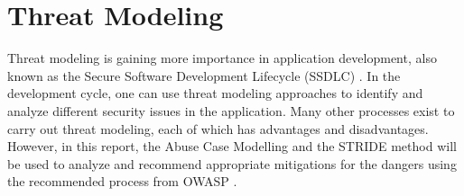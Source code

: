 \chapter{Threat Modeling}
\label{chap:threat_modeling}
Threat modeling is gaining more importance in application development, also known as the Secure Software Development Lifecycle (SSDLC) \citep{snyk_2022}. In the development cycle, one can use threat modeling approaches to identify and analyze different security issues in the application. Many other processes exist to carry out threat modeling, each of which has advantages and disadvantages. However, in this report, the Abuse Case Modelling and the STRIDE method will be used to analyze and recommend appropriate mitigations for the dangers using the recommended process from OWASP \citep{owasp_threat_model_process}.

